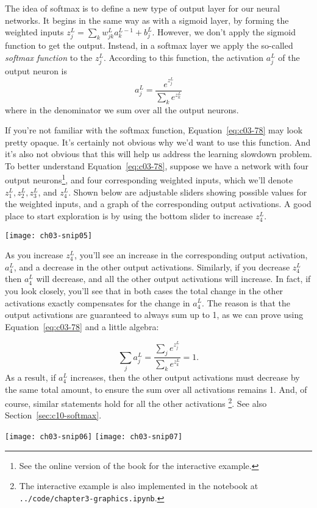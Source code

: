 The idea of softmax is to define a new type of output layer for our neural networks. It begins in the same way as with a sigmoid layer, by forming the weighted inputs
$z_{j}^{L}=\sum_{k} w_{j k}^{L} a_{k}^{L-1}+b_{j}^{L}$. However, we don't apply the sigmoid function to get the output. Instead, in a softmax layer we apply the so-called \textit{softmax function} to the $z_{j}^{L}$. According to this function, the activation $a^L_j$ of the  output neuron is 
\begin{equation}
a_{j}^{L}=\frac{e^{z_{j}^{L}}}{\sum_{k} e^{z_{k}^{L}}}
\label{eq:c03-78} 
\end{equation}
where in the denominator we sum over all the output neurons.

If you're not familiar with the softmax function, Equation~\ref{eq:c03-78}  may look pretty opaque. It's certainly not obvious why we'd want to use this function. And it's also not obvious that this will help us address the learning slowdown problem. To better understand Equation~\ref{eq:c03-78}, suppose we have a network with four output neurons\footnote{See the online version of the book for the interactive example.}, and four corresponding weighted inputs, which we'll denote $z_{1}^{L}, z_{2}^{L}, z_{3}^{L}$, and $z_{4}^{L}$. Shown below are adjustable sliders showing possible values for the weighted inputs, and a graph of the corresponding output activations. A good place to start exploration is by using the bottom slider to increase $z_{4}^{L}$.
\begin{marginfigure}
\texttt{[image: ch03-snip05]}
\end{marginfigure}
As you increase $z_{4}^{L}$, you'll see an increase in the corresponding output activation, $a_{4}^{L}$, and a decrease in the other output activations. Similarly, if you decrease $z_{4}^{L}$ then $a_{4}^{L}$ will decrease, and all the other output activations will increase. In fact, if you look closely, you'll see that in both cases the total change in the other activations exactly compensates for the change in $a_{4}^{L}$. 
The reason is that the output activations are guaranteed to always sum up to 1, as we can prove using Equation~\ref{eq:c03-78}   and a little algebra:

\begin{equation}
\sum_{j} a_{j}^{L}=\frac{\sum_{j} e^{z_{j}^{L}}}{\sum_{k} e^{z_{k}^{L}}}=1.
\label{eq:c03-79} 
\end{equation}
As a result, if $a_{4}^{L}$ increases, then the other output activations must decrease by the same total amount, to ensure the sum over all activations remains 1. And, of course, similar statements hold for all the other activations
\footnote{The interactive example is also implemented in the notebook at
\lstinline{../code/chapter3-graphics.ipynb}.}. See also Section~\ref{sec:c10-softmax}.
\begin{marginfigure}[-80mm]
\texttt{[image: ch03-snip06]}
\texttt{[image: ch03-snip07]}
\end{marginfigure}


